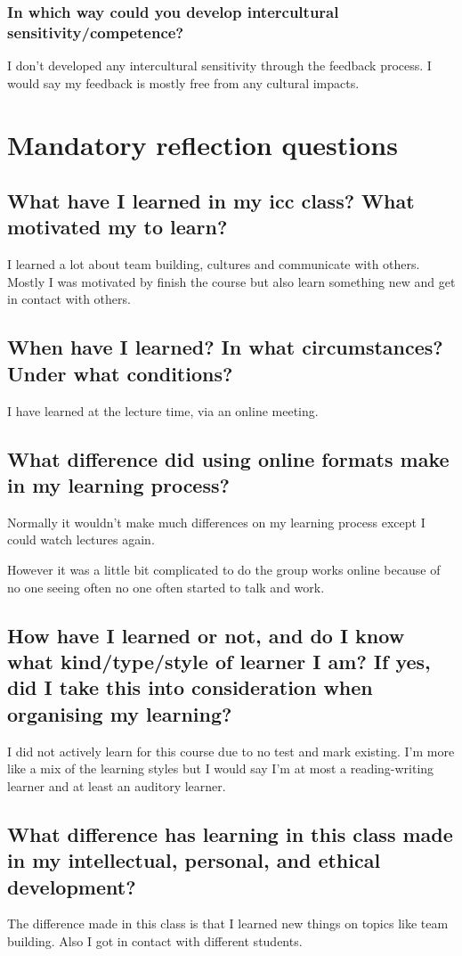 \documentclass[11pt,fleqn]{book} %
\begin{document}
\subsection{In which way could you develop intercultural sensitivity/competence?}
I don't developed any intercultural sensitivity through the feedback process. I would say my feedback is mostly free from any cultural impacts.

\chapter{Mandatory reflection questions}
\section{What have I learned in my icc class? What motivated my to learn?}
I learned a lot about team building, cultures and communicate with others. Mostly I was motivated by finish the course but also learn something new and get in contact with others.

\section{When have I learned? In what circumstances? Under what conditions?}
I have learned at the lecture time, via an online meeting.

\section{What difference did using online formats make in my learning process?}
Normally it wouldn't make much differences on my learning process except I could watch lectures again.

However it was a little bit complicated to do the group works online because of no one seeing often no one often started to talk and work.

\section{How have I learned or not, and do I know what kind/type/style of learner I am? If yes, did I take this into consideration when organising my learning?}
I did not actively learn for this course due to no test and mark existing. I'm more like a mix of the learning styles but I would say I'm at most a reading-writing learner and at least an auditory learner.

\section{What difference has learning in this class made in my intellectual, personal, and ethical development?}
The difference made in this class is that I learned new things on topics like team building. Also I got in contact with different students.
\end{document}
